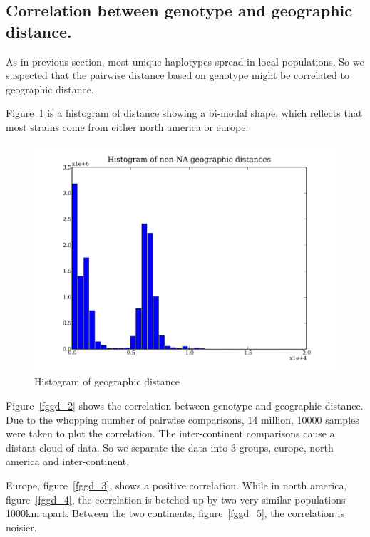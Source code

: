 \documentclass[a4paper,10pt]{article}
\begin{document}
\subsection{Correlation between genotype and geographic distance.}
As in previous section, most unique haplotypes spread in local populations. So we suspected that the pairwise distance based on genotype might be correlated to geographic distance.

Figure~\ref{fggd_1} is a histogram of distance showing a bi-modal shape, which reflects that most strains come from either north america or europe.

\begin{figure}
\includegraphics[width=1\textwidth]{figures/data_d110_c0_5_geo_distance_hist.png}
\caption{Histogram of geographic distance}\label{fggd_1}
\end{figure}

Figure~\ref{fggd_2} shows the correlation between genotype and geographic distance. Due to the whopping number of pairwise comparisons, 14 million, 10000 samples were taken to plot the correlation. The inter-continent comparisons cause a distant cloud of data. So we separate the data into 3 groups, europe, north america and inter-continent.

Europe, figure~\ref{fggd_3}, shows a positive correlation. While in north america, figure~\ref{fggd_4}, the correlation is botched up by two very similar populations 1000km apart. Between the two continents, figure~\ref{fggd_5}, the correlation is noisier.
\end{document}
